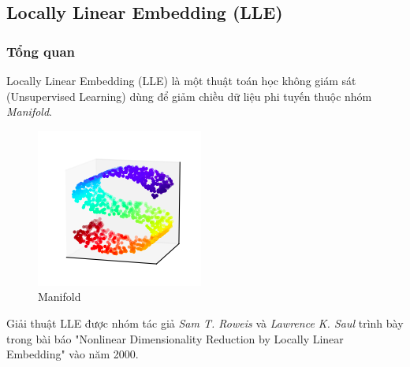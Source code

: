 \subsection{Locally Linear Embedding (LLE)}
\subsubsection{Tổng quan}

Locally Linear Embedding (LLE) là một thuật toán học không giám sát (Unsupervised Learning) dùng để giảm chiều dữ liệu phi tuyến thuộc nhóm \textit{Manifold}.

\begin{figure}[H]
	\begin{center}
		\includegraphics[scale=0.7]{images/ex1/manifold.png}
		\caption{Manifold}
	\end{center}
\end{figure}


Giải thuật LLE được nhóm tác giả \textit{Sam T. Roweis} và \textit{Lawrence K. Saul} trình bày trong bài báo "Nonlinear Dimensionality Reduction by Locally Linear Embedding" vào năm 2000.

